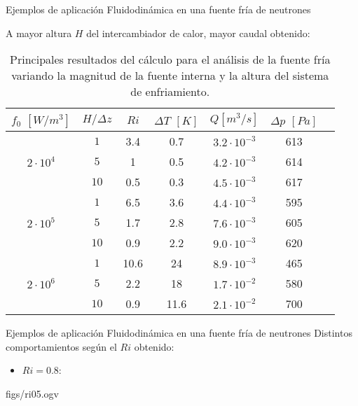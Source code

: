 \begin{frame}
{Ejemplos de aplicación}
{Fluidodinámica en una fuente fría de neutrones}

A mayor altura $H$ del intercambiador de calor, mayor caudal obtenido:

\begin{table}[h!]
  \centering
  \begin{tabular}{ c c c c c c c } 
      \hline
      \multicolumn{1}{c}{$f_0$ $[W/m^3]$} & \multicolumn{1}{c}{$H / \Delta z$} & \multicolumn{1}{c}{$Ri$} & \multicolumn{1}{c}{$\Delta T$ $[K]$} & \multicolumn{1}{c}{$Q$$[m^3/s]$}& \multicolumn{1}{c}{$\Delta p$ $[Pa]$} \\ \hline
      \multirow{3}{*}{$2\cdot10^4$} & $1$ & 3.4 & 0.7 & $3.2 \cdot 10^{-3}$ & 613 \\
                         & $5$ & 1 & 0.5 & $4.2 \cdot 10^{-3}$ & 614 \\
                         & $10$ & 0.5 & 0.3 & $4.5 \cdot 10^{-3}$ & 617 \\ \hline
      \multirow{3}{*}{$2\cdot10^5$} & $1$ & 6.5 & 3.6 & $4.4 \cdot 10^{-3}$ & 595 \\
                         & $5$ & 1.7 & 2.8 & $7.6 \cdot 10^{-3}$ & 605 \\
                         & $10$ & 0.9 & 2.2 & $9.0 \cdot 10^{-3}$ & 620 \\ \hline
      \multirow{3}{*}{$2\cdot10^6$} & $1$ & 10.6 & 24 & $8.9 \cdot 10^{-3}$ & 465 \\
                         & $5$ & 2.2 & 18 & $1.7 \cdot 10^{-2}$ & 580 \\
                         & $10$ & 0.9 & 11.6 & $2.1 \cdot 10^{-2}$ & 700 \\ \hline
   \end{tabular}   
   \caption[Principales resultados del cálculo para el análisis de la fuente fría variando la magnitud de la fuente interna y la altura del sistema de enfriamiento]
   {Principales resultados del cálculo para el análisis de la fuente fría variando la magnitud de la fuente interna y la altura del sistema de enfriamiento.}
   \label{tab-deuterio}
\end{table}

\end{frame}




\begin{frame}
{Ejemplos de aplicación}
{Fluidodinámica en una fuente fría de neutrones}
Distintos comportamientos según el $Ri$ obtenido:
\begin{itemize}
\item $Ri=0.8$:
\end {itemize}

\begin{center}
%
{figs/ri05.ogv} %
\end{center}

\end{frame}



